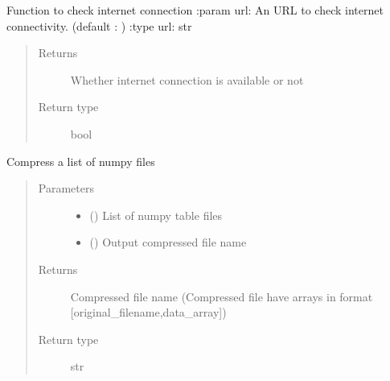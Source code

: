 \documentclass[letterpaper,10pt,english]{sphinxmanual}
\begin{document}

\begin{fulllineitems}
\label{\detokenize{paircars:paircars.basic_func.check_internet}}
\sphinxAtStartPar
Function to check internet connection
:param url: An URL to check internet connectivity. (default : )
:type url: str
\begin{quote}\begin{description}
\item[{Returns}] \leavevmode
\sphinxAtStartPar
Whether internet connection is available or not

\item[{Return type}] \leavevmode
\sphinxAtStartPar
bool

\end{description}\end{quote}

\end{fulllineitems}


\begin{fulllineitems}
\label{\detokenize{paircars:paircars.basic_func.compress_files}}
\sphinxAtStartPar
Compress a list of numpy files
\begin{quote}\begin{description}
\item[{Parameters}] \leavevmode\begin{itemize}
\item {} 
\sphinxAtStartPar
{} () \textendash{} List of numpy table files

\item {} 
\sphinxAtStartPar
{} () \textendash{} Output compressed file name

\end{itemize}

\item[{Returns}] \leavevmode
\sphinxAtStartPar
Compressed file name (Compressed file have arrays in format {[}original\_filename,data\_array{]})

\item[{Return type}] \leavevmode
\sphinxAtStartPar
str

\end{description}\end{quote}

\end{fulllineitems}
\end{document}
